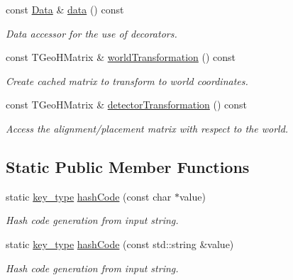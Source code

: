 \begin{DoxyCompactItemize}
const \hyperlink{class_d_d4hep_1_1_alignments_1_1_alignment_data}{Data} \& \hyperlink{class_d_d4hep_1_1_alignments_1_1_alignment_a4e3a6f62b476f5fac4a097ae55be8f62}{data} () const 
\begin{DoxyCompactList}\small\item\em Data accessor for the use of decorators. \item\end{DoxyCompactList}\item 
const TGeoHMatrix \& \hyperlink{class_d_d4hep_1_1_alignments_1_1_alignment_a0b069295a059a0f5f235f8e183972b8f}{worldTransformation} () const 
\begin{DoxyCompactList}\small\item\em Create cached matrix to transform to world coordinates. \item\end{DoxyCompactList}\item 
const TGeoHMatrix \& \hyperlink{class_d_d4hep_1_1_alignments_1_1_alignment_a0ea856e451cf788ed524fc9a523769c2}{detectorTransformation} () const 
\begin{DoxyCompactList}\small\item\em Access the alignment/placement matrix with respect to the world. \item\end{DoxyCompactList}\end{DoxyCompactItemize}
\subsection*{Static Public Member Functions}
\begin{DoxyCompactItemize}
\item 
static \hyperlink{class_d_d4hep_1_1_alignments_1_1_alignment_ab824a65f935a0c79b9ea1a7a85014b88}{key\_\-type} \hyperlink{class_d_d4hep_1_1_alignments_1_1_alignment_a18d349855ba9d9d8ae27949f9fbc020f}{hashCode} (const char $\ast$value)
\begin{DoxyCompactList}\small\item\em Hash code generation from input string. \item\end{DoxyCompactList}\item 
static \hyperlink{class_d_d4hep_1_1_alignments_1_1_alignment_ab824a65f935a0c79b9ea1a7a85014b88}{key\_\-type} \hyperlink{class_d_d4hep_1_1_alignments_1_1_alignment_af5a53c031ebc0778ce96097696b4055c}{hashCode} (const std::string \&value)
\begin{DoxyCompactList}\small\item\em Hash code generation from input string. \item\end{DoxyCompactList}\end{DoxyCompactItemize}


